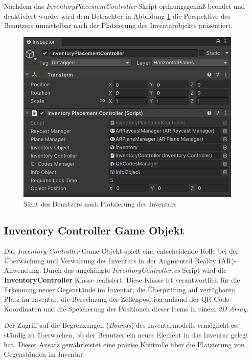 Nachdem das \textit{InventoryPlacementController}-Skript ordnungsgemäß beendet und deaktiviert wurde, wird dem Betrachter
in Abbildung \ref{fig:inventoryPlaced} die Perspektive des Benutzers unmittelbar nach der Platzierung des Inventarobjekts
präsentiert.
\begin{figure}[h]
    \centering
    \includegraphics[scale=0.8]{images/invPlace_Editor}
    \caption{Sicht des Benutzers nach Platzierung des Inventars}
    \label{fig:inventoryPlaced}
\end{figure}

\subsection{Inventory Controller Game Objekt}
Das \textit{Inventory Controller} Game Objekt spielt eine entscheidende Rolle bei der Überwachung und Verwaltung des
Inventars in der Augmented Reality (AR)-Anwendung. Durch das angehängte \textit{InventoryController.cs} Script wird die
\textbf{InventoryController} Klasse realisiert. Diese Klasse ist verantwortlich für die Erkennung neuer Gegenstände im
Inventar, die Überprüfung auf verfügbaren Platz im Inventar, die Berechnung der Zellenposition anhand der QR-Code-Koordinaten
und die Speicherung der Positionen dieser Items in einem \textit{2D Array}.

Der Zugriff auf die Begrenzungen (\textit{Bounds}) des Inventarmodells ermöglicht es, ständig zu überwachen, ob der
Benutzer ein neues Element in das Inventar gelegt hat. Dieser Ansatz gewährleistet eine präzise Kontrolle über die
Platzierung von Gegenständen im Inventar.

